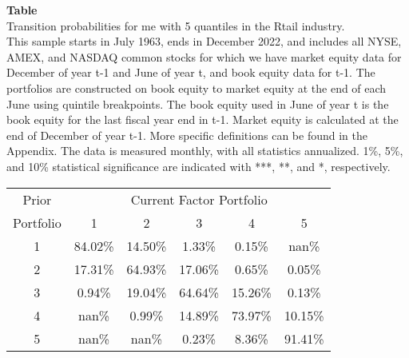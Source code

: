 \begin{table*}[ht!]
\raggedright
{}
\label{tab: transition_probs_me_Rtail_with_5_quantiles}
\textbf{Table \thetable} \\
Transition probabilities for me with 5 quantiles in the Rtail industry. \\
\hspace*{1em}This sample starts in July 1963, ends in December 2022, and includes all NYSE, AMEX, and NASDAQ common stocks for which we have market equity data for December of year t-1 and June of year t, and book equity data for t-1. The portfolios are constructed on book equity to market equity at the end of each June using quintile breakpoints.  The book equity used in June of year t is the book equity for the last fiscal year end in t-1.  Market equity is calculated at the end of December of year t-1.  More specific definitions can be found in the Appendix.  The data is measured monthly, with all statistics annualized.  1\%, 5\%, and 10\% statistical significance are indicated with ***, **, and *, respectively. \\
\vspace{0.5em}
\centering
\begin{adjustbox}{max width=\textwidth}
\begin{tabular}{@{}cccccc@{}}
\toprule
Prior & \multicolumn{5}{c}{Current Factor Portfolio} \\
Portfolio & 1 & 2 & 3 & 4 & 5 \\
\midrule
1 & 84.02\% & 14.50\% & 1.33\% & 0.15\% & nan\% \\
2 & 17.31\% & 64.93\% & 17.06\% & 0.65\% & 0.05\% \\
3 & 0.94\% & 19.04\% & 64.64\% & 15.26\% & 0.13\% \\
4 & nan\% & 0.99\% & 14.89\% & 73.97\% & 10.15\% \\
5 & nan\% & nan\% & 0.23\% & 8.36\% & 91.41\% \\
\bottomrule
\end{tabular}
\end{adjustbox}
\end{table*}